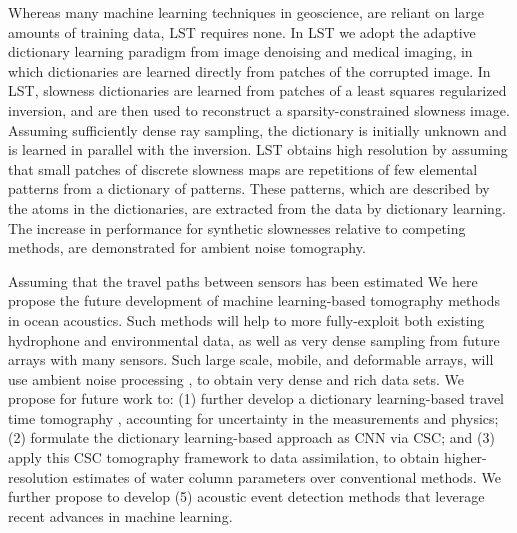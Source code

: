 Whereas many machine learning techniques in geoscience\cite{kong2018}, are reliant on large amounts of training data, LST requires none. In LST we adopt the adaptive dictionary learning paradigm from image denoising \cite{elad2010} and medical imaging\cite{ravishankar2011}, in which dictionaries are learned directly from patches of the corrupted image. In LST, slowness dictionaries are learned from patches of a least squares regularized inversion, and are then used to reconstruct a sparsity-constrained slowness image. Assuming sufficiently dense ray sampling, the dictionary is initially unknown and is learned in parallel with the inversion. LST obtains high resolution by assuming that small patches of discrete slowness maps are repetitions of few elemental patterns from a dictionary of patterns. These patterns, which are described by the atoms in the dictionaries, are extracted from the data by dictionary learning. The increase in performance for synthetic slownesses relative to competing methods, are demonstrated for  ambient noise tomography\cite{bianco2018}. 

Assuming that the travel paths between sensors has been estimated\cite{sabra2005,gerstoft2006} We here propose the future development of machine learning-based tomography methods in ocean acoustics. Such methods will help to more fully-exploit both existing hydrophone and environmental data, as well as very dense sampling from future arrays with many sensors. Such large scale, mobile, and deformable arrays, will use ambient noise processing \cite{sabra2005}, to obtain very dense and rich data sets. We propose for future work to: (1) further develop a dictionary learning-based travel time tomography \cite{bianco2018}, accounting for uncertainty in the measurements and physics; (2) formulate the dictionary learning-based approach as CNN via CSC; and (3) apply this CSC tomography framework to  data assimilation, to obtain higher-resolution estimates of water column parameters over conventional methods. We further propose to develop  (5) acoustic event detection methods that leverage recent advances in machine learning.

